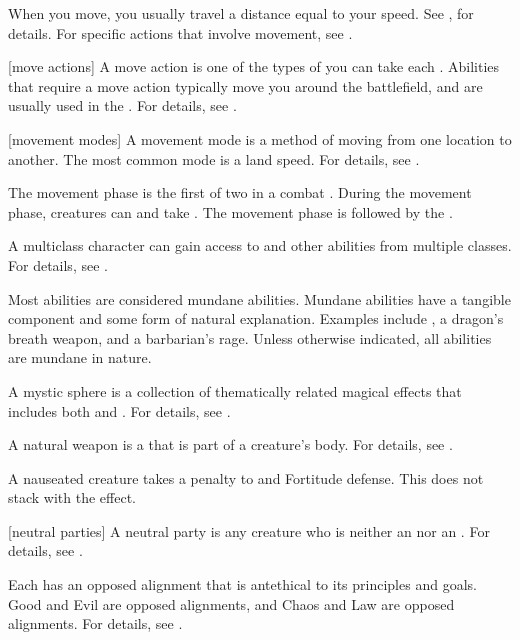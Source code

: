  When you move, you usually travel a distance equal to your speed.
See , for details.
For specific actions that involve movement, see .

[move actions] A move action is one of the types of  you can take each .
Abilities that require a move action typically move you around the battlefield, and are usually used in the .
For details, see .

[movement modes] A movement mode is a method of moving from one location to another.
The most common mode is a land speed.
For details, see .

 The movement phase is the first of two  in a combat .
During the movement phase, creatures can  and take .
The movement phase is followed by the .

 A multiclass character can gain access to  and other abilities from multiple classes.
For details, see .

 Most abilities are considered mundane abilities.
Mundane abilities have a tangible component and some form of natural explanation.
Examples include , a dragon's breath weapon, and a barbarian's rage.
Unless otherwise indicated, all abilities are mundane in nature.

 A mystic sphere is a collection of thematically related magical effects that includes both  and .
For details, see .

 A natural weapon is a  that is part of a creature's body.
For details, see .

 A nauseated creature takes a  penalty to  and Fortitude defense.
This does not stack with the  effect.

[neutral parties] A neutral party is any creature who is neither an  nor an .
For details, see .

 Each  has an opposed alignment that is antethical to its principles and goals.
Good and Evil are opposed alignments, and Chaos and Law are opposed alignments.
For details, see .

